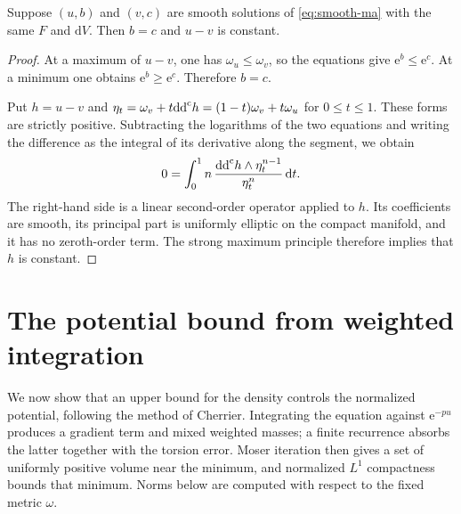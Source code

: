 \begin{proposition}\label{prop:smooth-uniqueness}
Suppose $(u,b)$ and $(v,c)$ are smooth solutions of \eqref{eq:smooth-ma} with the same $F$ and $\mathrm{d}V$. Then $b=c$ and $u-v$ is constant.
\end{proposition}
\begin{proof}
At a maximum of $u-v$, one has $\omega_u\leq\omega_v$, so the equations give $\mathrm{e}^b\leq \mathrm{e}^c$. At a minimum one obtains $\mathrm{e}^b\geq \mathrm{e}^c$. Therefore $b=c$.

Put $h=u-v$ and $\eta_t=\omega_v+t\mathrm{dd}^{\mathrm{c}} h=(1-t)\omega_v+t\omega_u$ for $0\leq t\leq1$. These forms are strictly positive. Subtracting the logarithms of the two equations and writing the difference as the integral of its derivative along the segment, we obtain
\[
 0=\int_0^1 n\,\frac{\mathrm{dd}^{\mathrm{c}} h\wedge\eta_t^{n-1}}{\eta_t^n}\,\mathrm{d}t.
\]
The right-hand side is a linear second-order operator applied to $h$. Its coefficients are smooth, its principal part is uniformly elliptic on the compact manifold, and it has no zeroth-order term. The strong maximum principle therefore implies that $h$ is constant.
\end{proof}

\section{The potential bound from weighted integration}

We now show that an upper bound for the density controls the normalized potential, following the method of Cherrier. Integrating the equation against $\mathrm{e}^{-pu}$ produces a gradient term and mixed weighted masses; a finite recurrence absorbs the latter together with the torsion error. Moser iteration then gives a set of uniformly positive volume near the minimum, and normalized $L^1$ compactness bounds that minimum. Norms below are computed with respect to the fixed metric $\omega$.

